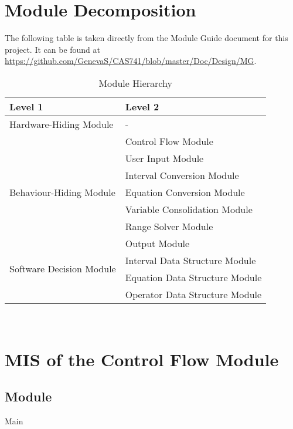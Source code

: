 \documentclass[12pt, titlepage]{article}
\begin{document}
\newpage
\section{Module Decomposition}

The following table is taken directly from the Module Guide document for this 
project. It can be found at 
\url{https://github.com/GenevaS/CAS741/blob/master/Doc/Design/MG}.

\begin{table}[h!]
	\centering
	\begin{tabular}{p{} p{}}
		\toprule
		\textbf{Level 1} & \textbf{Level 2}\\
		\midrule
		
		{Hardware-Hiding Module} & - \\
		\midrule
		
		\multirow{7}{0.29\textwidth}{Behaviour-Hiding Module} & Control Flow 
		Module \\
		& User Input Module \\
		& Interval Conversion Module \\
		& Equation Conversion Module \\
		& Variable Consolidation Module \\
		& Range Solver Module \\
		& Output Module \\
		\midrule
		
		\multirow{2}{0.29\textwidth}{Software Decision Module} & Interval Data 
		Structure Module \\
		& Equation Data Structure Module \\
		& Operator Data Structure Module \\
		\bottomrule
		
	\end{tabular}
	\caption{Module Hierarchy}
	\label{TblMH}
\end{table}

~\newpage

\section{MIS of the Control Flow Module} 
\label{Module_controlflow}

\subsection{Module}

Main
\end{document}
